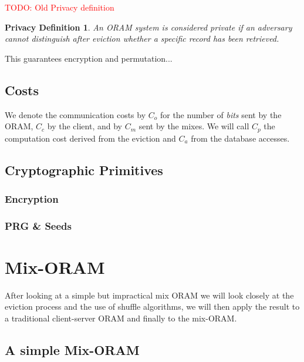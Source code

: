 \documentclass[english,oneside,twocolumn]{article}
\newtheorem{privdef}{Privacy Definition}
\newcommand{\todo}[1]{\textcolor{red}{TODO: #1}}
\begin{document}
\todo{Old Privacy definition}

\begin{privdef}
An ORAM system is considered private if an adversary cannot distinguish after eviction whether a specific record has been retrieved. 
\end{privdef}

This guarantees encryption and permutation...

\subsection{Costs}
We denote the communication costs by $C_o$ for the number of \emph{bits} sent by the ORAM, $C_{c}$ by the client, and by $C_{m}$ sent by the mixes. 
We will call $C_p$ the computation cost derived from the eviction and $C_a$ from the database accesses.

\subsection{Cryptographic Primitives}
\subsubsection{Encryption}
\subsubsection{PRG \& Seeds}

\section{Mix-ORAM}
\label{Mix-ORAM}
After looking at a simple but impractical mix ORAM we will look closely at the eviction process and the use of shuffle algorithms, we will then apply the result to a traditional client-server ORAM and finally to the mix-ORAM.

\subsection{A simple Mix-ORAM}
\end{document}
